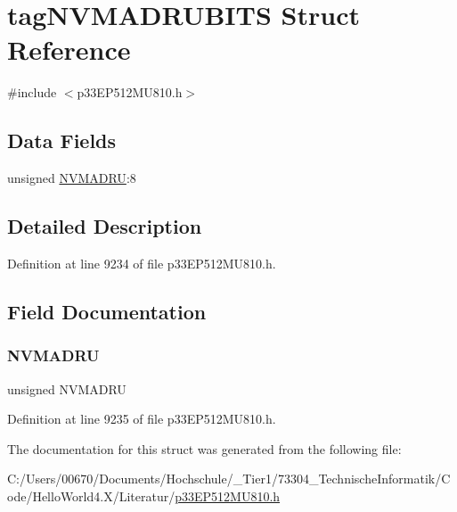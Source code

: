\hypertarget{structtag_n_v_m_a_d_r_u_b_i_t_s}{}\section{tag\+N\+V\+M\+A\+D\+R\+U\+B\+I\+TS Struct Reference}
\label{structtag_n_v_m_a_d_r_u_b_i_t_s}


{\ttfamily \#include $<$p33\+E\+P512\+M\+U810.\+h$>$}

\subsection*{Data Fields}
\begin{DoxyCompactItemize}
\item 
unsigned \hyperlink{structtag_n_v_m_a_d_r_u_b_i_t_s_a4d837a6bcd628797de13fba4b2afbe77}{N\+V\+M\+A\+D\+RU}\+:8
\end{DoxyCompactItemize}


\subsection{Detailed Description}


Definition at line 9234 of file p33\+E\+P512\+M\+U810.\+h.



\subsection{Field Documentation}
\mbox{\label{structtag_n_v_m_a_d_r_u_b_i_t_s_a4d837a6bcd628797de13fba4b2afbe77}} 
\subsubsection{\texorpdfstring{N\+V\+M\+A\+D\+RU}{NVMADRU}}
{\footnotesize\ttfamily unsigned N\+V\+M\+A\+D\+RU}



Definition at line 9235 of file p33\+E\+P512\+M\+U810.\+h.



The documentation for this struct was generated from the following file\+:\begin{DoxyCompactItemize}
\item 
C\+:/\+Users/00670/\+Documents/\+Hochschule/\+\_\+\+Tier1/73304\+\_\+\+Technische\+Informatik/\+Code/\+Hello\+World4.\+X/\+Literatur/\hyperlink{p33_e_p512_m_u810_8h}{p33\+E\+P512\+M\+U810.\+h}\end{DoxyCompactItemize}
